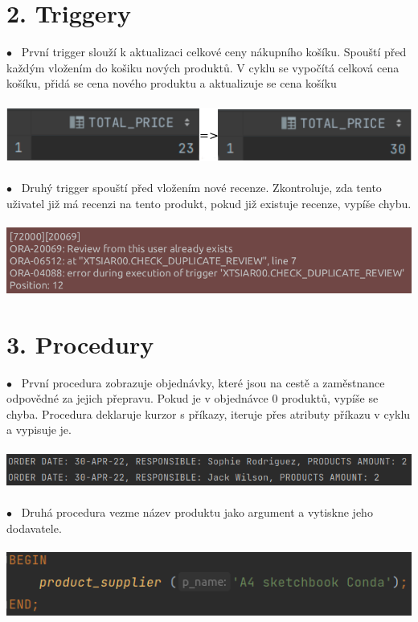 \documentclass[12pt]{article}
\begin{document}
\section*{2. Triggery}
    $\bullet$~ První trigger slouží k aktualizaci celkové ceny nákupního košíku. Spouští před každým vložením do košiku nových produktů. V cyklu se vypočítá celková cena košíku, přidá se cena nového produktu a aktualizuje se cena košíku
    \\
    \\
    \includegraphics[scale=0.54]{1-2.png}
    \\
    \\
    $\bullet$~ Druhý trigger spouští před vložením nové recenze. Zkontroluje, zda tento uživatel již má recenzi na tento produkt, pokud již existuje recenze, vypíše chybu.
    \\
    \\
    \includegraphics[scale=0.6075]{3.png}

\section*{3. Procedury}
    $\bullet$~ První procedura zobrazuje objednávky, které jsou na cestě a zaměstnance odpovědné za jejich přepravu. Pokud je v objednávce 0 produktů, vypíše se chyba. Procedura deklaruje kurzor s příkazy, iteruje přes atributy příkazu v cyklu a vypisuje je.
    \\
    \\
    \includegraphics[scale=0.66]{4.png}
    \\
    \\
    $\bullet$~ Druhá procedura vezme název produktu jako argument a vytiskne jeho dodavatele. 
    \\
    \\
    \includegraphics[scale=0.66]{5.png}
\end{document}
